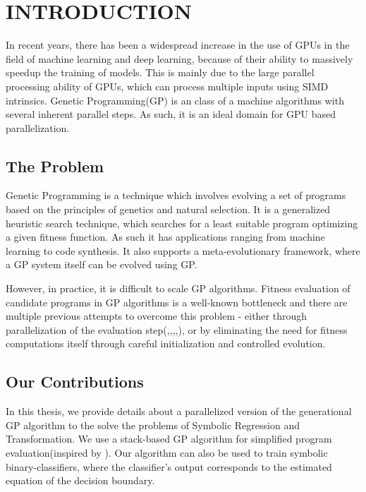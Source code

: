 \chapter{INTRODUCTION} \label{chap:intro}
In recent years, there has been a widespread increase in the use of GPUs in the field of machine learning and deep learning, because of their ability to massively speedup the training of models. This is mainly due to the large parallel processing ability of GPUs, which can process multiple inputs using SIMD intrinsics. Genetic Programming(GP) is an class of a machine algorithms with several inherent parallel steps. As such, it is an ideal domain for GPU based parallelization. 

\section{The Problem}
\label{intro:problem}
Genetic  Programming is a technique which involves evolving a set of programs based on the principles of genetics and natural selection. It is a generalized heuristic search technique, which searches for a least suitable program optimizing a given fitness function. 
As such it has applications ranging from machine learning to code synthesis.\citep{Koza92} It also supports a meta-evolutionary framework, where a GP system itself can be evolved using GP.\citep{schaul2010metalearning}

However, in practice, it is difficult to scale GP algorithms. Fitness evaluation of candidate programs in GP algorithms is a well-known bottleneck and there are multiple previous attempts to overcome this problem - either through parallelization of the evaluation step(\citep{10.1007/978-3-540-71605-1_9},\citep{baeta2021tensorgp},\citep{DEAP_JMLR2012},\citep{gplearn},\citep{staats2017tensorflow}), or by eliminating the need for fitness computations itself through careful initialization and controlled evolution.\citep{biles2001autonomous}

\section{Our Contributions}
\label{intro:contrib} 
In this thesis, we provide details about a parallelized version of the generational GP algorithm to the solve the problems of Symbolic Regression and Transformation. We use a stack-based GP algorithm for simplified program evaluation(inspired by \citep{perkis}). Our algorithm can also be used to train symbolic binary-classifiers, where the classifier's output corresponds to the estimated equation of the decision boundary. 

